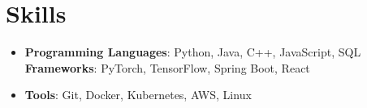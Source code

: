 \documentclass[letterpaper,11pt]{article}
\newcommand{\resumeSubHeadingListStart}{\begin{itemize}[leftmargin=*]}
\newcommand{\resumeSubHeadingListEnd}{\end{itemize}}
\begin{document}
\section{Skills}
  \resumeSubHeadingListStart
    \item{
      \textbf{Programming Languages}{: Python, Java, C++, JavaScript, SQL}
      \hfill
      \textbf{Frameworks}{: PyTorch, TensorFlow, Spring Boot, React}
    }
    \item{
      \textbf{Tools}{: Git, Docker, Kubernetes, AWS, Linux}
    }
  \resumeSubHeadingListEnd


\end{document}
